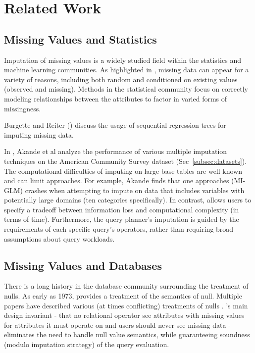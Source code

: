 \section{Related Work}


\subsection{Missing Values and Statistics}
Imputation of missing values is a widely studied field within the statistics and machine
learning communities. As highlighted in \cite{gelman2006data}, missing data
can appear for a variety of reasons, including both random and conditioned on
existing values (observed and missing). Methods in the statistical community
focus on correctly modeling relationships between the attributes to factor in
varied forms of missingness.

Burgette and Reiter (\cite{burgette2010multiple}) discuss the usage of
sequential regression trees for imputing missing data.

In \cite{akande2015empirical}, Akande et al analyze the performance of various
multiple imputation techniques on the American Community Survey dataset
(Sec~\ref{subsec:datasets}). The computational difficulties of imputing on large base
tables are well known and can limit approaches. For example, Akande finds that
one approaches (MI-GLM) crashes when attempting to impute on data that
includes variables with potentially large domains (ten categories specifically).
In contrast, \ProjectName{} allows users to specify a tradeoff between
information loss and computational complexity (in terms of time). Furthermore,
the query planner's imputation is guided by the requirements of each specific
query's operators, rather than requiring broad assumptions about query
workloads.  

\subsection{Missing Values and Databases}
There is a long history in the database community surrounding the
treatment of nulls. As early as 1973, \cite{codd1973understanding}
provides a treatment of the semantics of null. Multiple
papers have described various (at times conflicting) treatments
of nulls \cite{grant1977null}. \ProjectName's main design invariant - that no relational operator
see attributes with missing values for attributes it must operate on and users should never see
missing data - eliminates
the need to handle null value semantics, while guaranteeing soundness (modulo
imputation strategy) of the query evaluation.

